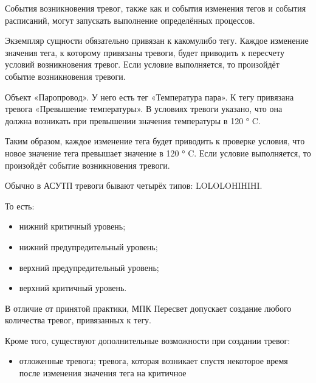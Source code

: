 \documentclass[a4paper,10pt,russian]{sphinxmanual}
\begin{document}
\sphinxAtStartPar
События возникновения тревог, также как и события изменения тегов и
события расписаний, могут запускать выполнение определённых процессов.

\sphinxAtStartPar
Экземпляр сущности  обязательно привязан к какому\sphinxhyphen{}либо тегу.
Каждое изменение значения тега, к которому привязаны тревоги, будет приводить к
пересчету условий возникновения тревог. Если условие выполняется, то произойдёт
событие возникновения тревоги.



\sphinxAtStartPar
{}

\sphinxAtStartPar
Объект «Паропровод». У него есть тег \sphinxhyphen{} «Температура пара». К тегу привязана
тревога «Превышение температуры». В условиях тревоги указано, что она должна
возникать при превышении значения температуры в 120 ° C.

\sphinxAtStartPar
Таким образом, каждое изменение тега будет приводить к проверке условия, что
новое значение тега превышает значение в 120 ° C. Если условие выполняется,
то произойдёт событие возникновения тревоги.



\sphinxAtStartPar
Обычно в АСУТП тревоги бывают четырёх типов: LOLO\sphinxhyphen{}LO\sphinxhyphen{}HI\sphinxhyphen{}HIHI.

\sphinxAtStartPar
То есть:
\begin{itemize}
\item {}
\sphinxAtStartPar
{} \sphinxhyphen{} нижний критичный уровень;

\item {}
\sphinxAtStartPar
{} \sphinxhyphen{} нижний предупредительный уровень;

\item {}
\sphinxAtStartPar
{} \sphinxhyphen{} верхний предупредительный уровень;

\item {}
\sphinxAtStartPar
{} \sphinxhyphen{} верхний критичный уровень.

\end{itemize}

\sphinxAtStartPar
В отличие от принятой практики, МПК Пересвет допускает создание любого
количества тревог, привязанных к тегу.

\sphinxAtStartPar
Кроме того, существуют дополнительные возможности при создании тревог:
\begin{itemize}
\item {}
\sphinxAtStartPar
отложенные тревога;
тревога, которая возникает спустя некоторое время после изменения значения
тега на критичное

\end{itemize}
\end{document}
